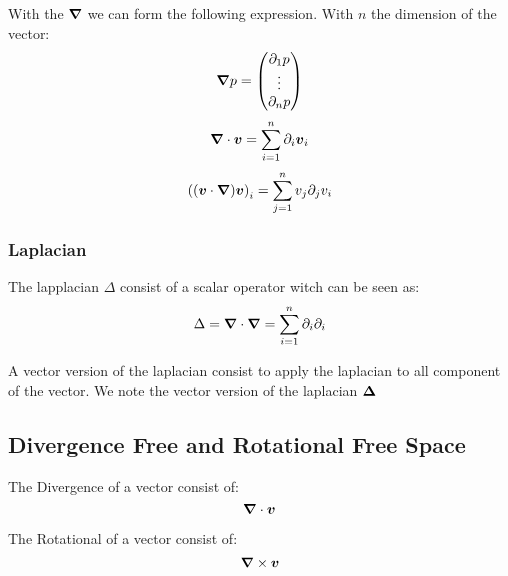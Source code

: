 With the ${\boldsymbol \nabla}$ we can form the following expression.
With $n$ the dimension of the vector:
\begin{equation}
 {\boldsymbol \nabla}p=\begin{pmatrix}\partial_1 p\\ \vdots \\ \partial_n p\end{pmatrix}
\end{equation}
\begin{equation}
 {\boldsymbol \nabla}\cdot {\boldsymbol v}=\sum_{i=1}^{n}\partial_i {\boldsymbol v}_i
\end{equation}
\begin{equation}
 \left(({\boldsymbol v}\cdot{\boldsymbol \nabla}){\boldsymbol v}\right)_{i}=\sum_{j=1}^{n}v_{j}\partial_{j} v_{i}
\end{equation}

\subsubsection{Laplacian}

\begin{definition}
The lapplacian $\Delta$ consist of a scalar operator witch can be seen as:
\begin{equation}
\Delta={\boldsymbol \nabla}\cdot {\boldsymbol \nabla}=\sum_{i=1}^{n} \partial_{i}\partial_{i}
\end{equation}
\end{definition}

\begin{definition}
A vector version of the laplacian consist to apply the laplacian to all component of the vector.
We note the vector version of the laplacian ${\boldsymbol \Delta}$
\end{definition}
\subsection{Divergence Free and Rotational Free Space}

\begin{definition}
 The Divergence of a vector consist of:
 \begin{equation}
  {\boldsymbol \nabla} \cdot {\boldsymbol v}
  \end{equation}
\end{definition}

\begin{definition}
 The Rotational of a vector consist of:
 \begin{equation}
  {\boldsymbol \nabla} \times {\boldsymbol v}
 \end{equation}
\end{definition}

